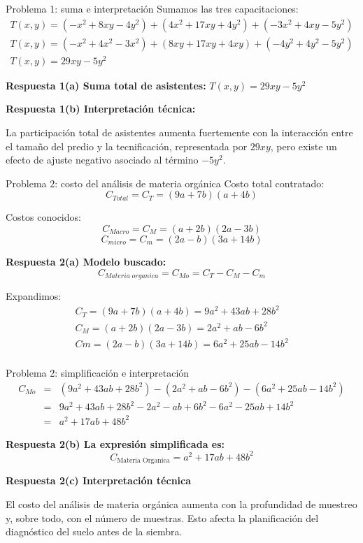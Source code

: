 \documentclass{beamer}
\begin{document}
	\begin{frame}{Problema 1: suma e interpretación}
		Sumamos las tres capacitaciones:
		\[
		\begin{array}{l}
			T(x,y)=(-x^2+8xy-4y^2)+(4x^2+17xy+4y^2)+(-3x^2+4xy-5y^2)\\
			T(x,y)=(-x^2+4x^2-3x^2)+(8xy+17xy+4xy)+(-4y^2+4y^2-5y^2)\\
			T(x,y)=29xy-5y^2
		\end{array}
		\]
		
		\textbf{Respuesta 1(a) Suma total de asistentes:} $T(x,y)=29xy-5y^2$
		
		\medskip
		
		\textbf{Respuesta 1(b) Interpretación técnica:}
		
		La participación total de asistentes aumenta fuertemente con la interacción entre el tamaño del predio y la tecnificación, representada por \(29xy\), pero existe un efecto de ajuste negativo asociado al término \(-5y^2\).
	\end{frame}
	
	\begin{frame}{Problema 2: costo del análisis de materia orgánica}
		Costo total contratado:
		\[
		C_{Total}=C_T=(9a+7b)(a+4b)
		\]
		
		Costos conocidos:
		\[
		C_{Macro}=C_M=(a+2b)(2a-3b)
		\]
		\[
		C_{micro}=C_m=(2a-b)(3a+14b)
		\]
		
		\textbf{Respuesta 2(a) Modelo buscado:}
		\[
		C_{Materia\; organica}=C_{Mo}=C_T-C_M-C_m
		\]
		
		Expandimos:
		\[
		\begin{array}{lcl}
			C_T=(9a+7b)(a+4b)=9a^2+43ab+28b^2\\
			C_M=(a+2b)(2a-3b)=2a^2+ab-6b^2\\
			Cm=(2a-b)(3a+14b)=6a^2+25ab-14b^2\\
		\end{array}
		\]
		
	\end{frame}
	
	\begin{frame}{Problema 2: simplificación e interpretación}
		\[
		\begin{array}{lcl}
			C_{Mo}&=&(9a^2+43ab+28b^2)-(2a^2+ab-6b^2)-(6a^2+25ab-14b^2)\\
			&=&9a^2+43ab+28b^2-2a^2-ab+6b^2-6a^2-25ab+14b^2\\
			&=&a^2+17ab+48b^2
		\end{array}
		\]
		
		\textbf{Respuesta 2(b) La expresión simplificada es:}
		\[
		C_{\text{Materia Organica}}= a^2+17ab+48b^2
		\]
		
		
		\textbf{Respuesta 2(c) Interpretación técnica}
		
		El costo del análisis de materia orgánica aumenta con la profundidad de muestreo y, sobre todo, con el número de muestras. Esto afecta la planificación del diagnóstico del suelo antes de la siembra.
	\end{frame}
	
\end{document}
